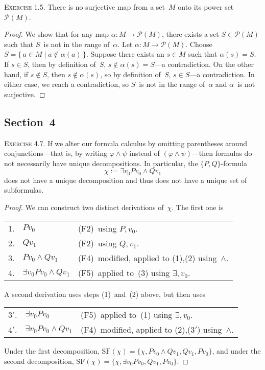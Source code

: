 \documentclass[letterpaper]{article}
\newcommand{\ps}{\mathcal{P}}
\newcommand{\sfs}{\mathrm{SF}}
\theoremstyle{remark}
\begin{document}
\noindent\textsc{Exercise 1.5.}
There is no surjective map from a set~$M$ onto its power set~$\ps(M)$.
\begin{proof}
We show that for any map $\alpha:M\to\ps(M)$, there exists a set $S\in\ps(M)$ such that $S$~is not in the range of~$\alpha$. Let $\alpha:M\to\ps(M)$. Choose $S=\{\,a\in M\mid a\not\in\alpha(a)\,\}$. Suppose there exists an $s\in M$ such that $\alpha(s)=S$. If $s\in S$, then by definition of~$S$, $s\not\in\alpha(s)=S$---a contradiction. On the other hand, if $s\not\in S$, then $s\not\in\alpha(s)$, so by definition of~$S$, $s\in S$---a contradiction. In either case, we reach a contradiction, so $S$~is not in the range of~$\alpha$ and $\alpha$~is not surjective.
\end{proof}

\subsection*{Section~4}
\noindent\textsc{Exercise 4.7.}
If we alter our formula calculus by omitting parentheses around conjunctions---that is, by writing $\varphi\land\psi$ instead of $(\varphi\land\psi)$---then formulas do not necessarily have unique decompositions. In particular, the $\{P,Q\}$-formula
$$\chi:=\exists v_0Pv_0\land Qv_1$$
does not have a unique decomposition and thus does not have a unique set of subformulas.
\begin{proof}
We can construct two distinct derivations of~$\chi$. The first one is
\begin{center}
\begin{tabular}{rll}
1.&$Pv_0$&(F2)~using $P,v_0$.\\
2.&$Qv_1$&(F2)~using $Q,v_1$.\\
3.&$Pv_0\land Qv_1$&(F4)~modified, applied to (1),(2) using~$\land$.\\
4.&$\exists v_0Pv_0\land Qv_1$&(F5)~applied to~(3) using $\exists,v_0$.
\end{tabular}
\end{center}
A second derivation uses steps (1)~and~(2) above, but then uses
\begin{center}
\begin{tabular}{rll}
$3'$.&$\exists v_0Pv_0$&(F5)~applied to~(1) using $\exists,v_0$.\\
$4'$.&$\exists v_0Pv_0\land Qv_1$&(F4)~modified, applied to (2),($3'$) using~$\land$.
\end{tabular}
\end{center}
Under the first decomposition, $\sfs(\chi)=\{\chi,Pv_0\land Qv_1,Qv_1,Pv_0\}$, and under the second decomposition, $\sfs(\chi)=\{\chi,\exists v_0Pv_0,Qv_1,Pv_0\}$.
\end{proof}
\end{document}

